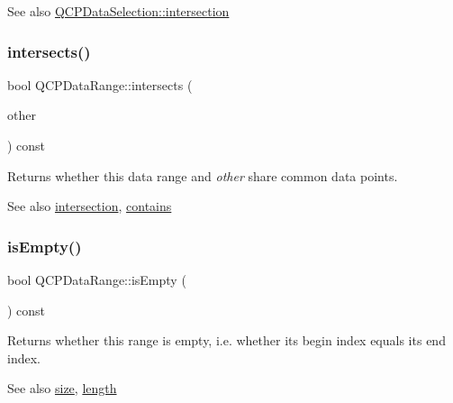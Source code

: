 \begin{DoxySeeAlso}{See also}
\hyperlink{classQCPDataSelection_af5267ced53687561367105ee77b874ab}{Q\+C\+P\+Data\+Selection\+::intersection} 
\end{DoxySeeAlso}
\mbox{\label{classQCPDataRange_a8a1c437f9beffd55621f48f961d7f679}} 
\subsubsection{\texorpdfstring{intersects()}{intersects()}}
{\footnotesize\ttfamily bool Q\+C\+P\+Data\+Range\+::intersects (\begin{DoxyParamCaption}\item[{const \hyperlink{classQCPDataRange}{Q\+C\+P\+Data\+Range} \&}]{other }\end{DoxyParamCaption}) const}

Returns whether this data range and {\itshape other} share common data points.

\begin{DoxySeeAlso}{See also}
\hyperlink{classQCPDataRange_a84e1e03129dd52528efb4bac18d30183}{intersection}, \hyperlink{classQCPDataRange_a13ca398776374a3160aa85433718b812}{contains} 
\end{DoxySeeAlso}
\mbox{\label{classQCPDataRange_ac32e53fc05d6cd2eac96b96a7265d3b8}} 
\subsubsection{\texorpdfstring{is\+Empty()}{isEmpty()}}
{\footnotesize\ttfamily bool Q\+C\+P\+Data\+Range\+::is\+Empty (\begin{DoxyParamCaption}{ }\end{DoxyParamCaption}) const\hspace{0.3cm}{\ttfamily [inline]}}

Returns whether this range is empty, i.\+e. whether its begin index equals its end index.

\begin{DoxySeeAlso}{See also}
\hyperlink{classQCPDataRange_ac6af055e509d1b691c244954ff1c5887}{size}, \hyperlink{classQCPDataRange_a1e7836058f755c6ab9f11996477b7150}{length} 
\end{DoxySeeAlso}
\mbox{\label{classQCPDataRange_aae53a37472212dca0a7939963e20dba0}} 
